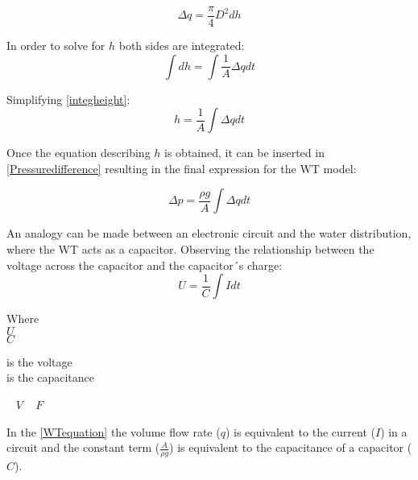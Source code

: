 \begin{equation}
  \Delta q =  \frac{\pi}{4} D^2 {dh}
\end{equation}

In order to solve for $h$ both sides are integrated: 
\begin{equation}
  \int dh = \int \frac{1}{A} \Delta q dt
  \label{integheight}
\end{equation}

Simplifying \eqref{integheight}:
\begin{equation}
  h =\frac{1}{A}  \int  \Delta q dt
\end{equation}

Once the equation describing $h$ is obtained, it can be inserted in \eqref{Pressuredifference} 
resulting in the final expression for the WT model:


\begin{equation}
  \Delta p =  \frac{\rho g}{A}  \int  \Delta q dt
  \label{WTequation}
\end{equation}

An analogy can be made between an electronic circuit and the water distribution, where the WT acts as a 
capacitor.  Observing the relationship between the voltage across the capacitor and the 
capacitor´s charge:
\begin{equation}
  U = \frac{1}{C} \int I dt
  \label{ElecCircuirt}
\end{equation}

\begin{minipage}[t]{0.20\textwidth}
Where\\
\hspace*{8mm} $U$ \\
\hspace*{8mm} $C$ 
\end{minipage}
\begin{minipage}[t]{0.68\textwidth}
\vspace*{2mm}
is the voltage\\
is the capacitance 
\end{minipage}
\begin{minipage}[t]{0.10\textwidth}
\vspace*{2mm}
\textcolor{White}{te}$\unit{V}$
\textcolor{White}{te}$\unit{F}$
\end{minipage}

In the \eqref{WTequation} the volume flow rate ($q$) is equivalent to the current ($I$) in a 
circuit and the constant term \big($\frac{A}{\rho g}$\big) is equivalent to the 
capacitance of a capacitor ($C$).
